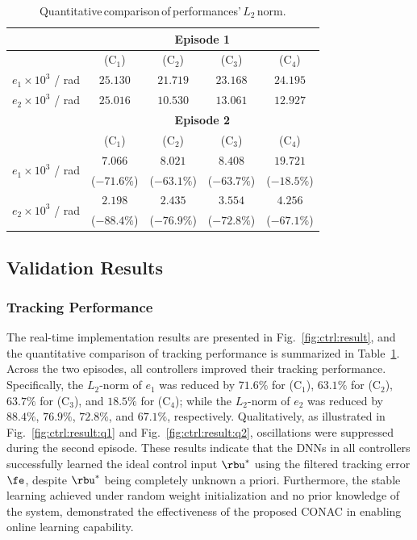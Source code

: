 \documentclass[journal]{IEEEtran}
\begin{document}
\begin{table}[!t]
    \renewcommand{\arraystretch}{1.3}
    \caption{Quantitative\,comparison\,of\,performances'\,$L_2$\,norm.}
    \centering
    \begin{tabular}{c c c c c}
    \hline
		& \multicolumn{4}{c}{\textbf{Episode 1}} \\
    \hline
	\hline 
		& (C$_1$) & (C$_2$) & (C$_3$) & (C$_4$) \\
	\hline
		$e_1\times10^{3}$ / rad & $25.130$ & $21.719$ & $23.168$ & $24.195$ \\ 
	\hline
        $e_2\times10^{3}$ / rad & $25.016$ & $10.530$ & $13.061$ & $12.927$ \\
	\hline
        & \multicolumn{4}{c}{\textbf{Episode 2}} \\
    \hline
    \hline
        & (C$_1$) & (C$_2$) & (C$_3$) & (C$_4$) \\
	\hline
    \multirow{2}{*}{$e_1\times10^{3}$ / rad} 
        & $7.066$ & $8.021$ & $8.408$ & $19.721$ \\
        & ($-71.6\%$) & ($-63.1\%$) & ($-63.7\%$) & ($-18.5\%$) \\
    \hline
    \multirow{2}{*}{$e_2\times10^{3}$ / rad} 
        & $2.198$ & $2.435$ & $3.554$ & $4.256$ \\
        & ($-88.4\%$) & ($-76.9\%$) & ($-72.8\%$) & ($-67.1\%$) \\
    \hline
    \end{tabular}
    \label{tab:sim:L2}
\end{table}

\subsection{Validation Results}

\subsubsection{Tracking Performance}

The real-time implementation results are presented in Fig.~\ref{fig:ctrl:result}, and the quantitative comparison of tracking performance is summarized in Table~\ref{tab:sim:L2}.
Across the two episodes, all controllers improved their tracking performance. 
Specifically, the $L_2$-norm of $e_1$ was reduced by $71.6 \%$ for (C$_1$), $63.1 \%$ for (C$_2$), $63.7 \%$ for (C$_3$), and $18.5 \%$ for (C$_4$); while the $L_2$-norm of $e_2$ was reduced by $88.4 \%$, $76.9 \%$, $72.8 \%$, and $67.1 \%$, respectively.
Qualitatively, as illustrated in Fig.~\ref{fig:ctrl:result:q1} and Fig.~\ref{fig:ctrl:result:q2}, oscillations were suppressed during the second episode.
These results indicate that the DNNs in all controllers successfully learned the ideal control input $\rbu^*$ using the filtered tracking error $\fe$, despite $\rbu^*$ being completely unknown a priori.
Furthermore, the stable learning achieved under random weight initialization and no prior knowledge of the system, demonstrated the effectiveness of the proposed CONAC in enabling online learning capability.
\end{document}
